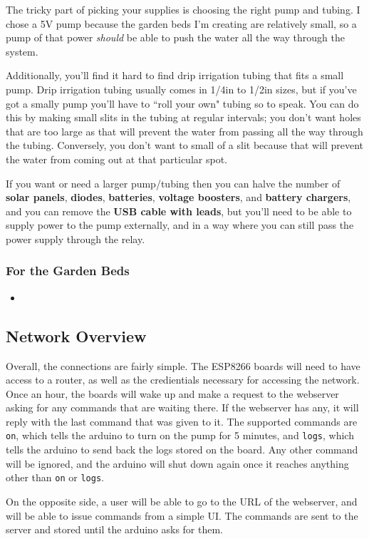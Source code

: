 The tricky part of picking your supplies is choosing the right pump and tubing.
I chose a 5V pump because the garden beds I'm creating are relatively small, so a pump of that power \textit{should} be able to push the water all the way through the system.

Additionally, you'll find it hard to find drip irrigation tubing that fits a small pump. 
Drip irrigation tubing usually comes in 1/4in to 1/2in sizes, but if you've got a smally pump you'll have to ``roll your own" tubing so to speak.
You can do this by making small slits in the tubing at regular intervals; you don't want holes that are too large as that will prevent the water from passing all the way through the tubing.
Conversely, you don't want to small of a slit because that will prevent the water from coming out at that particular spot.

If you want or need a larger pump/tubing then you can halve the number of \textbf{solar panels}, \textbf{diodes}, \textbf{batteries}, \textbf{voltage boosters}, and \textbf{battery chargers}, and you can remove the \textbf{USB cable with leads}, but you'll need to be able to supply power to the pump externally, and in a way where you can still pass the power supply through the relay.

\subsubsection*{For the Garden Beds}
\begin{multicols}{2}
    \begin{itemize}
        \item 
    \end{itemize}
\end{multicols}

\subsection{Network Overview}
Overall, the connections are fairly simple.
The ESP8266 boards will need to have access to a router, as well as the credientials necessary for accessing the network.
Once an hour, the boards will wake up and make a request to the webserver asking for any commands that are waiting there.
If the webserver has any, it will reply with the last command that was given to it.
The supported commands are \texttt{on}, which tells the arduino to turn on the pump for 5 minutes, and \texttt{logs}, which tells the arduino to send back the logs stored on the board. Any other command will be ignored, and the arduino will shut down again once it reaches anything other than \texttt{on} or \texttt{logs}.

On the opposite side, a user will be able to go to the URL of the webserver, and will be able to issue commands from a simple UI. The commands are sent to the server and stored until the arduino asks for them.
